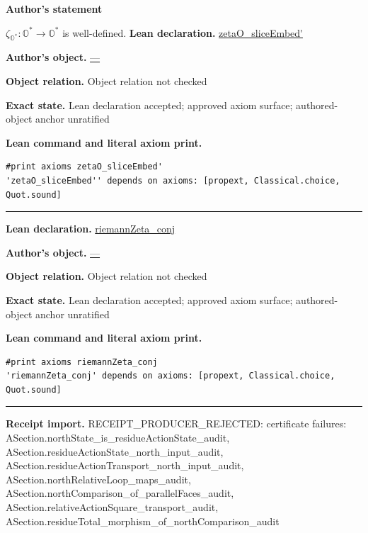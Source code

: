 \documentclass[11pt]{article}
\newcommand{\OO}{\mathbb{O}}
\newcommand{\Ostar}{\OO^{*}}
\newcommand{\zetaO}{\zeta_{\Ostar}}
\theoremstyle{plain}
\theoremstyle{definition}
\theoremstyle{remark}
\begin{document}
\begin{tcolorbox}[provenancecard,title={18. Proposition - Well-definedness},title after break={18. Proposition - Well-definedness (continued)}]
\textbf{Author's statement}\par
$\zetaO:\Ostar\to\Ostar$ is well-defined.
\tcblower
\textbf{Lean declaration.} \url{zetaO_sliceEmbed'}
\par\textbf{Author's object.} \url{—}
\par\textbf{Object relation.} Object relation not checked
\par\textbf{Exact state.} Lean declaration accepted; approved axiom surface; authored-object anchor unratified
\par\smallskip\textbf{Lean command and literal axiom print.}
\begin{Verbatim}[breaklines=true,breakanywhere=true,fontsize=\small]
#print axioms zetaO_sliceEmbed'
'zetaO_sliceEmbed'' depends on axioms: [propext, Classical.choice, Quot.sound]
\end{Verbatim}
\medskip\hrule\medskip
\textbf{Lean declaration.} \url{riemannZeta_conj}
\par\textbf{Author's object.} \url{—}
\par\textbf{Object relation.} Object relation not checked
\par\textbf{Exact state.} Lean declaration accepted; approved axiom surface; authored-object anchor unratified
\par\smallskip\textbf{Lean command and literal axiom print.}
\begin{Verbatim}[breaklines=true,breakanywhere=true,fontsize=\small]
#print axioms riemannZeta_conj
'riemannZeta_conj' depends on axioms: [propext, Classical.choice, Quot.sound]
\end{Verbatim}
\medskip\hrule\medskip
\textbf{Receipt import.} \textcolor{KgtRed}{RECEIPT\_PRODUCER\_REJECTED: certificate failures: ASection.northState\_is\_residueActionState\_audit, ASection.residueActionState\_north\_input\_audit, ASection.residueActionTransport\_north\_input\_audit, ASection.northRelativeLoop\_maps\_audit, ASection.northComparison\_of\_parallelFaces\_audit, ASection.relativeActionSquare\_transport\_audit, ASection.residueTotal\_morphism\_of\_northComparison\_audit}
\end{tcolorbox}
\medskip
\end{document}
